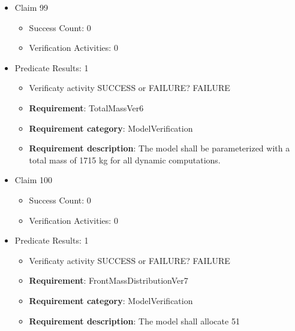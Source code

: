 \documentclass{article}
\begin{document}
\begin{itemize}
\begin{itemize}
					\item \textbf{Requirement}: CommunicationFrequencyVer5 
					\item \textbf{Requirement category}: ModelVerification
					\item \textbf{Requirement description}: The model shall update and transmit its state variables, forces, and kinematic outputs at a fixed rate of 100 Hz.
					\end{itemize}

  				  \item Claim 99
				\begin{itemize}
			    	\item Success Count: 0 
			    	\item Verification Activities: 0
				\end{itemize}
				
									    
				\item Predicate Results: 1
					\begin{itemize}				
					\item Verificaty activity SUCCESS or FAILURE? FAILURE
					
					\item \textbf{Requirement}: TotalMassVer6 
					\item \textbf{Requirement category}: ModelVerification
					\item \textbf{Requirement description}: The model shall be parameterized with a total mass of 1715 kg for all dynamic computations.
					\end{itemize}

  				  \item Claim 100
				\begin{itemize}
			    	\item Success Count: 0 
			    	\item Verification Activities: 0
				\end{itemize}
				
									    
				\item Predicate Results: 1
					\begin{itemize}				
					\item Verificaty activity SUCCESS or FAILURE? FAILURE
					
					\item \textbf{Requirement}: FrontMassDistributionVer7 
					\item \textbf{Requirement category}: ModelVerification
					\item \textbf{Requirement description}: The model shall allocate 51%
					\end{itemize}


\end{itemize}
\end{document}
